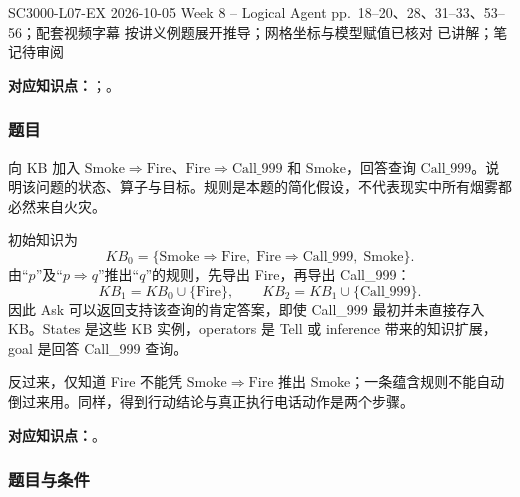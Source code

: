 
\examplemeta
  {SC3000-L07-EX}
  {2026-10-05}
  {Week 8 -- Logical Agent pp.~18--20、28、31--33、53--56；配套视频字幕}
  {按讲义例题展开推导；网格坐标与模型赋值已核对}
  {已讲解；笔记待审阅}


\textbf{对应知识点：}；。

\subsubsection*{题目}

向 KB 加入 $\mathrm{Smoke}\Rightarrow\mathrm{Fire}$、$\mathrm{Fire}\Rightarrow\mathrm{Call\_999}$ 和 $\mathrm{Smoke}$，回答查询 $\mathrm{Call\_999}$。说明该问题的状态、算子与目标。规则是本题的简化假设，不代表现实中所有烟雾都必然来自火灾。

\begin{workedsolution}
初始知识为
\[
  KB_0=\{\mathrm{Smoke}\Rightarrow\mathrm{Fire},\;
         \mathrm{Fire}\Rightarrow\mathrm{Call\_999},\;\mathrm{Smoke}\}.
\]
由“$p$”及“$p\Rightarrow q$”推出“$q$”的规则，先导出 Fire，再导出 Call\_999：
\[
  KB_1=KB_0\cup\{\mathrm{Fire}\},\qquad
  KB_2=KB_1\cup\{\mathrm{Call\_999}\}.
\]
因此 Ask 可以返回支持该查询的肯定答案，即使 Call\_999 最初并未直接存入 KB。States 是这些 KB 实例，operators 是 Tell 或 inference 带来的知识扩展，goal 是回答 Call\_999 查询。

反过来，仅知道 Fire 不能凭 $\mathrm{Smoke}\Rightarrow\mathrm{Fire}$ 推出 Smoke；一条蕴含规则不能自动倒过来用。同样，得到行动结论与真正执行电话动作是两个步骤。
\end{workedsolution}


\textbf{对应知识点：}。

\subsubsection*{题目与条件}


